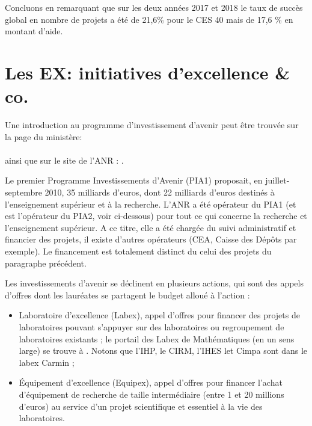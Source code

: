 Concluons en remarquant que sur les deux ann\'ees 2017 et 2018 le taux de succès global en nombre de projets a \'et\'e de 21,6\% pour le CES 40 mais de 17,6 \% en montant d'aide.


\section{Les EX: \og initiatives d'excellence\fg{} \& co.}\label{trucenex}
Une introduction au programme d'\og{}investissement d'avenir\fg{} peut \^etre trouv\'ee sur la page du minist\`ere: \\
{\small {}} \\
ainsi que sur le site de l'ANR : 
. 

Le premier Programme Investissements d'Avenir (PIA1) proposait, en juillet-septembre 2010, 35 milliards d'euros, 
dont 22 milliards d'euros destin\'es \`a l'enseignement sup\'erieur et \`a la recherche.
L'ANR a {\'e}t{\'e} op{\'e}rateur du PIA1 (et est l'op{\'e}rateur du PIA2, voir ci-dessous) 
pour tout ce qui concerne la recherche et l'enseignement sup{\'e}rieur. 
A ce titre, elle a {\'e}t{\'e} charg{\'e}e du suivi administratif et financier des projets, 
il existe d'autres op{\'e}rateurs (CEA, Caisse des D{\'e}pôts par exemple). 
Le financement est totalement distinct du celui des projets du paragraphe pr{\'e}c{\'e}dent.

Les investissements d'avenir se d\'eclinent en plusieurs \og actions\fg{}, qui sont des appels d'offres dont les laur\'eat\mp e\mp s 
se partagent le budget allou\'e \`a l'action :
\begin{itemize}
\item Laboratoire d'excellence (Labex), appel d'offres pour financer des projets de laboratoires pouvant s'appuyer 
sur des laboratoires ou regroupement de laboratoires existants ; 
le portail des Labex de Math{\'e}matiques (en un sens large) se trouve {\`a}  . 
Notons que l'IHP, le CIRM, l'IHES let Cimpa sont dans le labex Carmin ; %
\item \'Equipement d'excellence (Equipex), appel d'offres pour financer l'achat d'\'equipement de recherche 
de taille interm\'ediaire (entre 1 et 20 millions d'euros) au service d'un projet scientifique et 
essentiel \`a la vie des laboratoires.
\end{itemize}

